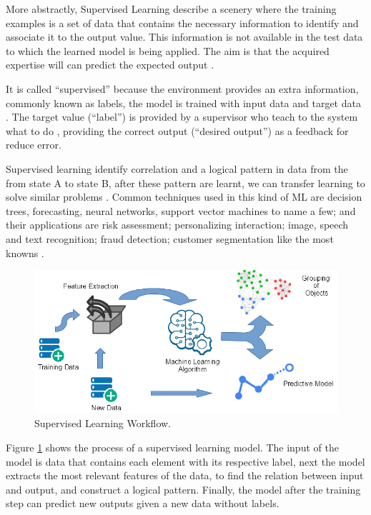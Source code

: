 \documentclass[12pt]{report}
\begin{document}
More abstractly, Supervised Learning describe a scenery where the training examples is a set of data that contains the necessary information to identify and associate it to the output value. This information is not available in the test data to which the learned model is being applied. The aim is that the acquired expertise will can predict the expected output \cite{Shai2014}.

It is called “supervised” because the environment provides an extra information, commonly known as labels, the model is trained with input data and target data \cite{Shai2014}. The target value (``label'') is provided by a supervisor who teach to the system what to do \cite{Goodfellow2016} , providing the correct output (``desired output'') as a feedback for reduce error.

Supervised learning identify correlation and a logical pattern in data from the from state A to state B, after these pattern are learnt, we can transfer learning to solve similar problems \cite{Nevala2017} \cite{Cer2018}. Common techniques used in this kind of \ac{ML} are decision trees, forecasting, neural networks, support vector machines to name a few; and their applications are risk assessment; personalizing interaction; image, speech and text recognition; fraud detection; customer segmentation like the most knowns \cite{Nevala2017}.

\begin{figure}[H]	
	\centering	
	\includegraphics[width=150mm, scale = 1]{images/1_Supervised.png}
	\caption{Supervised Learning Workflow.}
	\label{figure:Supervised_Learning}
\end{figure}

Figure \ref{figure:Supervised_Learning} shows the process of a supervised learning model. The input of the model is data that contains each element with its respective label, next the model extracts the most relevant features of the data, to find the relation between input and output, and construct a logical pattern. Finally, the model after the training step can predict new outputs given a new data without labels.
\end{document}
